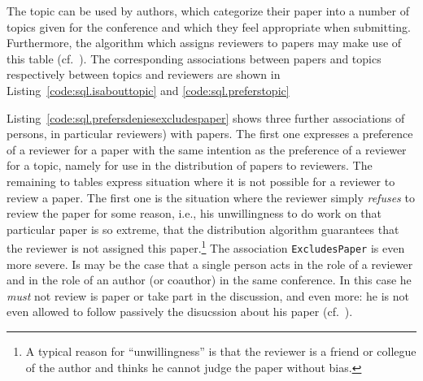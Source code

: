 %


The topic can be used by authors, which categorize their paper into a number
of topics given for the conference and which they feel appropriate when
submitting.  Furthermore, the algorithm which assigns reviewers to papers may
make use of this table (cf.\ \cite{coma:requirements}). The corresponding
associations between papers and topics respectively between topics and
reviewers are shown in Listing~\ref{code:sql.isabouttopic} and
\ref{code:sql.preferstopic}
%
%





%

%




\medskip

Listing~\ref{code:sql.prefersdeniesexcludespaper} shows three further
associations of persons, in particular reviewers) with papers. The first one
expresses a preference of a reviewer for a paper with the same intention as
the preference of a reviewer for a topic, namely for use in the distribution
of papers to reviewers.
%
The remaining to tables express situation where it is not possible for a
reviewer to review a paper. The first one is the situation where the reviewer
simply \emph{refuses} to review the paper for some reason, i.e., his
unwillingness to do work on that particular paper is so extreme, that the
distribution algorithm guarantees that the reviewer is not assigned this
paper.\footnote{A typical reason for ``unwillingness'' is that the reviewer is
  a friend or collegue of the author and thinks he cannot judge the paper
  without bias.} The association \texttt{ExcludesPaper} is even more severe.
Is may be the case that a single person acts in the role of a reviewer and in
the role of an author (or coauthor) in the same conference. In this case he
\emph{must} not review is paper or take part in the discussion, and even more:
he is not even allowed to follow passively the disucssion about his paper
(cf.\ \cite{coma:requirements}).

%




